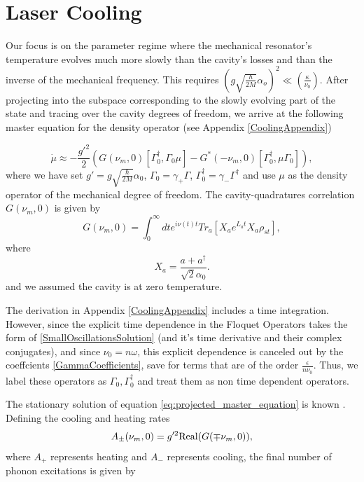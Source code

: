 \documentclass[reprint, amsmath,amssymb, aps,pra]{revtex4-1}
\begin{document}
\section{Laser Cooling}\label{LasCool}

Our focus is on the parameter regime where the mechanical resonator's
temperature evolves much more slowly than the cavity's losses and than
the inverse of the mechanical frequency. This requires
$(g\sqrt{\frac{\hbar}{2M}}\alpha_o)^2 \ll (\frac{\kappa}{\nu_0})$.
After projecting into the subspace corresponding to the slowly
evolving part of the state and tracing over the cavity degrees of
freedom, we arrive at the following master equation for the density
operator (see Appendix \ref{CoolingAppendix})

\begin{equation}\label{eq:projected_master_equation}
  \dot{\mu}\approx -\frac{g'^2}{2}(G(\nu_m,0)[\Gamma^\dagger_0,\Gamma_0\mu]-G^*(-\nu_m,0)[\Gamma_0^\dagger,\mu\Gamma_0]),
\end{equation}
where we have set $g'=g\sqrt{\frac{\hbar}{2M}}\alpha_0$,
$\Gamma_0=\gamma_+\Gamma$, $\Gamma_0^\dagger=\gamma_-\Gamma^\dagger$
and use $\mu$ as the density operator of the mechanical degree of
freedom. The cavity-quadratures correlation $G(\nu_m,0)$ is given by
\begin{equation} \label{CavityQuadrature}
G(\nu_m,0) = \int_0^\infty dt e^{i\nu(t) t}Tr_a[X_a e^{L_a t} X_a \rho_{st}],
\end{equation}
where 
\begin{equation}
X_a = \frac{a + a^\dagger}{\sqrt{2}\alpha_0}.
\end{equation}
and we assumed the cavity is at zero temperature.

The derivation in Appendix \ref{CoolingAppendix} includes a time
integration. However, since the explicit time dependence in the
Floquet Operators takes the form of \eqref{SmallOscillationsSolution}
(and it's time derivative and their complex conjugates), and since
$\nu_0 = n\omega$, this explicit dependence is canceled out by the
coeffcients \eqref{GammaCoefficients}, save for terms that are of the
order $\frac{\epsilon}{n\nu_0}$. Thus, we label these operators as
$\Gamma_0, \Gamma^\dagger_0$ and treat them as non time dependent
operators. 

The stationary solution of equation
\eqref{eq:projected_master_equation} is known \cite{LCNooshi}.
Defining the cooling and heating rates
\begin{equation}
A_\pm(\nu_m,0) = g'^2{\rm Real}(G(\mp \nu_m,0)),
\end{equation}
where $A_+$ represents heating and $A_-$ represents cooling, the final
number of phonon excitations is given by
\end{document}
